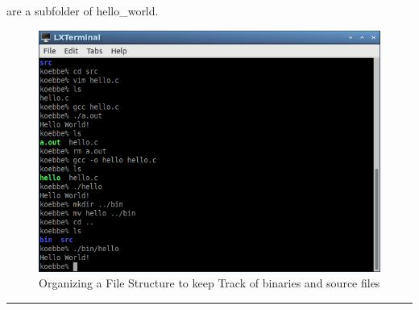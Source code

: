 \documentclass[10pt,fleqn]{article}
\begin{document}
are a subfolder of hello\_world.
\vfill
\begin{figure}[h]
\centering
\includegraphics[width=5.0in]{../images/hello_world_10.png}
\caption{Organizing a File Structure to keep Track of binaries and source files}
\end{figure}
\eject
\vskip0.1in\hrule\vskip0.1in
\end{document}
